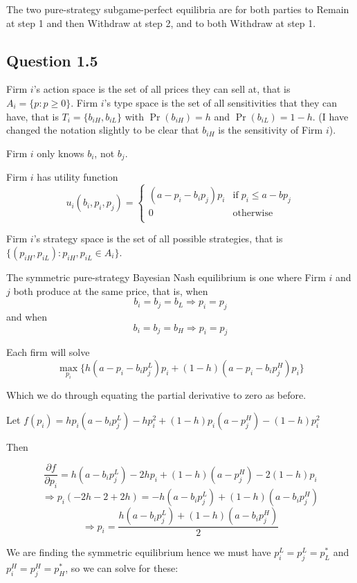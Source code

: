 \documentclass[11pt,a4paper]{article}
\begin{document}
The two pure-strategy subgame-perfect equilibria are for both parties to Remain at step 1 and then Withdraw at step 2, and to both Withdraw at step 1.

\subsection*{Question 1.5}

Firm $i$'s action space is the set of all prices they can sell at, that is $A_i = \{p: p \geq 0\}$.
Firm $i$'s type space is the set of all sensitivities that they can have, that is $T_i = \{b_{iH}, b_{iL}\}$ with $\Pr(b_{iH}) = h$ and $\Pr(b_{iL}) = 1-h$. (I have changed the notation slightly to be clear that $b_{iH}$ is the sensitivity of Firm $i$).

Firm $i$ only knows $b_i$, not $b_j$.

Firm $i$ has utility function $$u_i(b_i,p_i,p_j) = \begin{cases} 
      (a-p_i-b_ip_j)p_i & \text{if} \; p_i \leq a-bp_j \\
      0 & \text{otherwise} \\
\end{cases} $$
   
Firm $i$'s strategy space is the set of all possible strategies, that is $\{(p_{iH},p_{iL}): p_{iH}, p_{iL} \in A_i \}$.

The symmetric pure-strategy Bayesian Nash equilibrium is one where Firm $i$ and $j$ both produce at the same price, that is, when $$b_i = b_j = b_L \Rightarrow p_i = p_j$$ and when $$b_i = b_j = b_H \Rightarrow p_i = p_j$$

Each firm will solve $$\max_{p_i} \Big\{ h (a - p_i - b_i p_{j}^{L}) p_i + (1-h) (a - p_i - b_i p_{j}^{H}) p_i \Big\}$$

Which we do through equating the partial derivative to zero as before.


Let $f(p_i) = hp_i(a-b_ip_j^L)-hp_i^2 + (1-h)p_i(a-p_j^H)-(1-h)p_i^2 $

Then

$$\frac{\partial f}{\partial p_i} = h(a-b_ip_j^L) - 2hp_i + (1-h)(a-p_j^H) - 2(1-h)p_i $$
$$ \Rightarrow p_i(-2h-2+2h) = -h(a-b_ip_j^L) + (1-h)(a-b_ip_j^H) $$
$$ \Rightarrow p_i = \frac{h(a-b_ip_j^L)+(1-h)(a-b_ip_j^H)}{2}$$

We are finding the symmetric equilibrium hence we must have $p_i^L = p_j^L = p_L^*$ and $p_i^H = p_j^H = p_H^*$, so we can solve for these:
\end{document}
